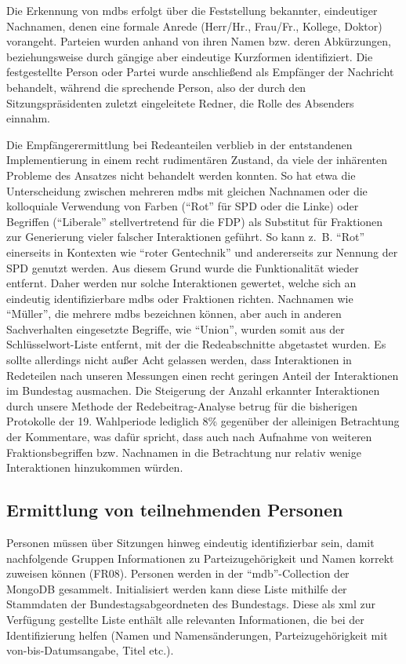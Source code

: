 Die Erkennung von \glspl{mdb} erfolgt über die Feststellung bekannter, eindeutiger
Nachnamen, denen eine formale Anrede (Herr/Hr., Frau/Fr., Kollege, Doktor)
vorangeht. Parteien wurden anhand von ihren Namen bzw. deren Abkürzungen,
beziehungsweise durch gängige aber eindeutige Kurzformen identifiziert. Die
festgestellte Person oder Partei wurde anschließend als Empfänger der Nachricht
behandelt, während die sprechende Person, also der durch den
Sitzungspräsidenten zuletzt eingeleitete Redner, die Rolle des Absenders
einnahm.

Die Empfängerermittlung bei Redeanteilen verblieb in der entstandenen
Implementierung in einem recht rudimentären Zustand, da viele der inhärenten
Probleme des Ansatzes nicht behandelt werden konnten. So hat etwa die
Unterscheidung zwischen mehreren \glspl{mdb} mit gleichen Nachnamen oder die
kolloquiale Verwendung von Farben (\enquote{Rot} für SPD oder die Linke) oder
Begriffen (\enquote{Liberale} stellvertretend für die FDP) als Substitut für
Fraktionen zur Generierung vieler falscher Interaktionen geführt. So kann
z.~B. \enquote{Rot} einerseits in Kontexten wie \enquote{roter Gentechnik} und
andererseits zur Nennung der SPD genutzt werden. Aus diesem Grund wurde die
Funktionalität wieder entfernt. Daher werden nur solche Interaktionen gewertet,
welche sich an eindeutig identifizierbare \glspl{mdb} oder Fraktionen richten.
Nachnamen wie \enquote{Müller}, die mehrere \glspl{mdb} bezeichnen können, aber
auch in anderen Sachverhalten eingesetzte Begriffe, wie \enquote{Union}, wurden
somit aus der Schlüsselwort-Liste entfernt, mit der die Redeabschnitte
abgetastet wurden. Es sollte allerdings nicht außer Acht gelassen werden, dass
Interaktionen in Redeteilen nach unseren Messungen einen recht geringen Anteil
der Interaktionen im Bundestag ausmachen. Die Steigerung der Anzahl erkannter
Interaktionen durch unsere Methode der Redebeitrag-Analyse betrug für die
bisherigen Protokolle der 19. Wahlperiode lediglich 8\% gegenüber der
alleinigen Betrachtung der Kommentare, was dafür spricht, dass auch nach
Aufnahme von weiteren Fraktionsbegriffen bzw. Nachnamen in die Betrachtung nur
relativ wenige Interaktionen hinzukommen würden.

\subsection{Ermittlung von teilnehmenden Personen}
Personen müssen über Sitzungen hinweg eindeutig identifizierbar sein, damit
nachfolgende Gruppen Informationen zu Parteizugehörigkeit und Namen korrekt
zuweisen können (FR08). Personen werden in der \enquote{mdb}-Collection der MongoDB
gesammelt. Initialisiert werden kann diese Liste mithilfe der Stammdaten der
Bundestagsabgeordneten des Bundestags. Diese als \gls{xml} zur Verfügung gestellte
Liste enthält alle relevanten Informationen, die bei der Identifizierung
helfen (Namen und Namensänderungen, Parteizugehörigkeit mit von-bis-Datumsangabe,
Titel etc.).

